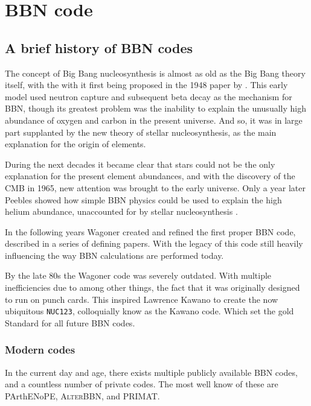 
\chapter{BBN code}
\label{chap:BBNcode}

\section{A brief history of BBN codes}
\label{sec:BBN_history}

The concept of Big Bang nucleosynthesis is almost as old as the Big Bang theory itself, with the with it first being proposed in the 1948 paper by \textcite{Gamov48}. This early model used neutron capture and subsequent beta decay as the mechanism for BBN, though its greatest problem was the inability to explain the unusually high abundance of oxygen and carbon in the present universe. And so, it was in large part supplanted by the new theory of stellar nucleosynthesis, as the main explanation for the origin of elements. 

During the next decades it became clear that stars could not be the only explanation for the present element abundances, and with the discovery of the CMB in 1965, new attention was brought to the early universe. 
Only a year later Peebles showed how simple BBN physics could be used to explain the high helium abundance, unaccounted for by stellar nucleosynthesis \cite{Peebles66}.

In the following years Wagoner created and refined the first proper BBN code, described in a series of defining papers\cite{Wagoner67}\cite{Wagoner69}\cite{Wagoner72}. With the legacy of this code still heavily influencing the way BBN calculations are performed today.

By the late 80s the Wagoner code was severely outdated. With multiple inefficiencies due to among other things, the fact that it was originally designed to run on punch cards. This inspired Lawrence Kawano to create the now ubiquitous \texttt{NUC123}, colloquially know as the Kawano code\cite{Kawano}. Which set the gold Standard for all future BBN codes. 

\subsection{Modern codes}
\label{sec:newcodes}
In the current day and age, there exists multiple publicly available BBN codes, and a countless number of private codes. The most well know of these are PArthENoPE, \textsc{AlterBBN}, and PRIMAT.

